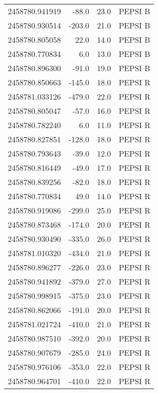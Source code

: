 \begin{tabular}{rrrl}
2458780.941919 &    -88.0 &           23.0 &    PEPSI B \\
2458780.930514 &   -203.0 &           21.0 &    PEPSI B \\
2458780.805058 &     22.0 &           14.0 &    PEPSI B \\
2458780.770834 &      6.0 &           13.0 &    PEPSI B \\
2458780.896300 &    -91.0 &           19.0 &    PEPSI B \\
2458780.850663 &   -145.0 &           18.0 &    PEPSI R \\
2458781.033126 &   -479.0 &           22.0 &    PEPSI R \\
2458780.805047 &    -57.0 &           16.0 &    PEPSI R \\
2458780.782240 &      6.0 &           11.0 &    PEPSI R \\
2458780.827851 &   -128.0 &           18.0 &    PEPSI R \\
2458780.793643 &    -39.0 &           12.0 &    PEPSI R \\
2458780.816449 &    -49.0 &           17.0 &    PEPSI R \\
2458780.839256 &    -82.0 &           18.0 &    PEPSI R \\
2458780.770834 &     49.0 &           14.0 &    PEPSI R \\
2458780.919086 &   -299.0 &           25.0 &    PEPSI R \\
2458780.873468 &   -174.0 &           20.0 &    PEPSI R \\
2458780.930490 &   -335.0 &           26.0 &    PEPSI R \\
2458781.010320 &   -434.0 &           21.0 &    PEPSI R \\
2458780.896277 &   -226.0 &           23.0 &    PEPSI R \\
2458780.941892 &   -379.0 &           27.0 &    PEPSI R \\
2458780.998915 &   -375.0 &           23.0 &    PEPSI R \\
2458780.862066 &   -191.0 &           20.0 &    PEPSI R \\
2458781.021724 &   -410.0 &           21.0 &    PEPSI R \\
2458780.987510 &   -392.0 &           20.0 &    PEPSI R \\
2458780.907679 &   -285.0 &           24.0 &    PEPSI R \\
2458780.976106 &   -353.0 &           22.0 &    PEPSI R \\
2458780.964701 &   -410.0 &           22.0 &    PEPSI R \\

\end{tabular}
